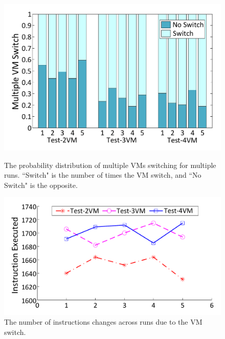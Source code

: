 \documentclass[preprint,12pt,3p]{elsarticle}
\begin{document}
\begin{figure}[t]
\centering
\begin{minipage}[t]{0.49\linewidth}
\centering
\includegraphics[width=.9\textwidth]{figure/testinfor.pdf}
\caption{The probability distribution of multiple VMs switching for multiple runs. ``Switch" is the number of times the VM switch, and ``No Switch" is the opposite.}\label{fig:Fig.testinfor}
\end{minipage}
\hspace{0.005\textwidth}
\begin{minipage}[t]{0.49\linewidth}
\centering
\includegraphics[width=.9\textwidth]{figure/testinstr.pdf}
\caption{The number of instructions changes across runs due to the VM switch.} \label{fig:Fig.testinstr}
\end{minipage}
\end{figure}
\end{document}
